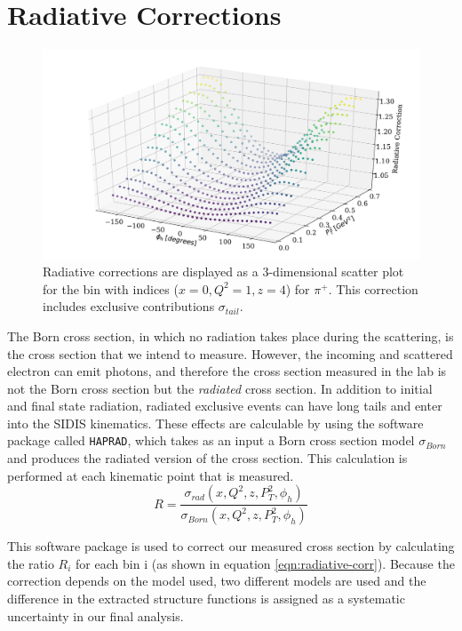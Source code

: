 \section{Radiative Corrections}

\begin{figure}
	\centering
	\includegraphics[width=\textwidth]{image/plots/sidis/pip_radcorr.pdf}
	\caption[Radiative corrections for $\pi^+$]{Radiative corrections are displayed as a 3-dimensional scatter plot for the bin with indices ($x = 0, Q^2 = 1, z = 4$) for $\pi^+$.  This correction includes exclusive contributions $\sigma_{tail}$.}
	\label{fig:radcorr-pip}	

\end{figure}

The Born cross section, in which no radiation takes place during the scattering, is the cross section that we intend to measure.  However, the incoming and scattered electron can emit photons, and therefore the cross section measured in the lab is not the Born cross section but the \textit{radiated} cross section.  In addition to initial and final state radiation, radiated exclusive events can have long tails and enter into the SIDIS kinematics.  These effects are calculable by using the software package called \texttt{HAPRAD}, which takes as an input a Born cross section model $\sigma_{Born}$ and produces the radiated version of the cross section. This calculation is performed at each kinematic point that is measured.  \\

\begin{equation}
	\label{eqn:radiative-corr}
	R = \frac{\sigma_{rad} (x, Q^2, z, P_T^2, \phi_h)}{\sigma_{Born} (x, Q^2, z, P_T^2, \phi_h)}
\end{equation}

This software package is used to correct our measured cross section by calculating the ratio $R_{i}$ for each bin i (as shown in equation \ref{eqn:radiative-corr}).  Because the correction depends on the model used, two different models are used and the difference in the extracted structure functions is assigned as a systematic uncertainty in our final analysis.


